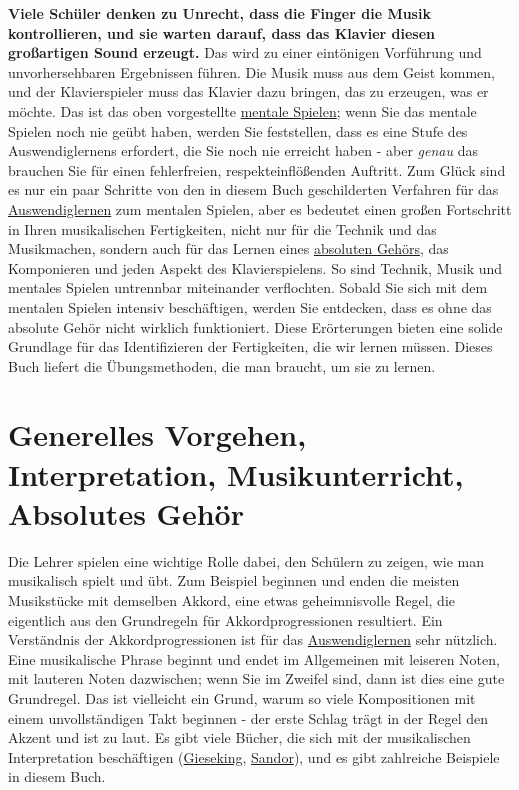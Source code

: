 \textbf{Viele Schüler denken zu Unrecht, dass die Finger die Musik kontrollieren, und sie warten darauf, dass das Klavier diesen großartigen Sound erzeugt.}
Das wird zu einer eintönigen Vorführung und unvorhersehbaren Ergebnissen führen.
Die Musik muss aus dem Geist kommen, und der Klavierspieler muss das Klavier dazu bringen, das zu erzeugen, was er möchte.
Das ist das oben vorgestellte \hyperref[c1ii12mental]{mentale Spielen};
wenn Sie das mentale Spielen noch nie geübt haben, werden Sie feststellen, dass es eine Stufe des Auswendiglernens erfordert, die Sie noch nie erreicht haben - aber \textit{genau} das brauchen Sie für einen fehlerfreien, respekteinflößenden Auftritt.
Zum Glück sind es nur ein paar Schritte von den in diesem Buch geschilderten Verfahren für das \hyperref[c1iii6]{Auswendiglernen} zum mentalen Spielen, aber es bedeutet einen großen Fortschritt in Ihren musikalischen Fertigkeiten, nicht nur für die Technik und das Musikmachen, sondern auch für das Lernen eines \hyperlink{c1iii12}{absoluten Gehörs}, das Komponieren und jeden Aspekt des Klavierspielens.
So sind Technik, Musik und mentales Spielen untrennbar miteinander verflochten.
Sobald Sie sich mit dem mentalen Spielen intensiv beschäftigen, werden Sie entdecken, dass es ohne das absolute Gehör nicht wirklich funktioniert.
Diese Erörterungen bieten eine solide Grundlage für das Identifizieren der Fertigkeiten, die wir lernen müssen.
Dieses Buch liefert die Übungsmethoden, die man braucht, um sie zu lernen.


\section{Generelles Vorgehen, Interpretation, Musikunterricht, Absolutes Gehör}
\label{c1i4}

Die Lehrer spielen eine wichtige Rolle dabei, den Schülern zu zeigen, wie man musikalisch spielt und übt.
Zum Beispiel beginnen und enden die meisten Musikstücke mit demselben Akkord, eine etwas geheimnisvolle Regel, die eigentlich aus den Grundregeln für Akkordprogressionen resultiert.
Ein Verständnis der Akkordprogressionen ist für das \hyperref[c1iii6]{Auswendiglernen} sehr nützlich.
Eine musikalische Phrase beginnt und endet im Allgemeinen mit leiseren Noten, mit lauteren Noten dazwischen; wenn Sie im Zweifel sind, dann ist dies eine gute Grundregel.
Das ist vielleicht ein Grund, warum so viele Kompositionen mit einem unvollständigen Takt beginnen - der erste Schlag trägt in der Regel den Akzent und ist zu laut.
Es gibt viele Bücher, die sich mit der musikalischen Interpretation beschäftigen (\hyperref[Gieseking]{Gieseking}, \hyperref[Sandor]{Sandor}), und es gibt zahlreiche Beispiele in diesem Buch.

